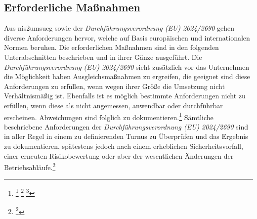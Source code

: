 \documentclass[11pt,a4paper,hidelinks]{article}   %
\begin{document}
        \subsection{Erforderliche Maßnahmen}
            Aus \gls{nis2umsucg} sowie der \emph{Durchführungsverordnung (EU) 2024/2690} gehen diverse Anforderungen hervor, welche auf Basis europäischen und internationalen Normen beruhen. Die erforderlichen Maßnahmen sind in den folgenden Unterabschnitten beschrieben und in ihrer Gänze ausgeführt. Die \emph{Durchführungsverordnung (EU) 2024/2690} sieht zusätzlich vor das Unternehmen die Möglichkeit haben Ausgleichsmaßnahmen zu ergreifen, die geeignet sind diese Anforderungen zu erfüllen, wenn wegen ihrer Größe die Umsetzung nicht Verhältnismäßig ist. Ebenfalls ist es möglich bestimmte Anforderungen nicht zu erfüllen, wenn diese als nicht angemessen, anwendbar oder durchführbar erscheinen. Abweichungen sind folglich zu dokumentieren.\footnote{
                \footcite[Vgl.][, Absatz 3]{EU2024-2690}
                \footcite[Vgl.][, Absatz 5]{EU2024-2690}
                \footcite[Vgl.][, Absatz 6]{EU2024-2690}
            } Sämtliche beschriebene Anforderungen der \emph{Durchführungsverordnung (EU) 2024/2690} sind in aller Regel in einem zu definierenden Turnus zu Überprüfen und das Ergebnis zu dokumentieren, spätestens jedoch nach einem erheblichen Sicherheitsvorfall, einer erneuten Risikobewertung oder aber der wesentlichen Änderungen der Betriebsabläufe.\footnote{
                \footcite[Vgl.][, Anhan, 1.1.2., 1.2.6., 2.1.4. , 2.2.3., 2.3.4., 3.1.3., 3.2.7., 3.5.5., 3.6.3., 4.1.4. , 4.2.6. , 4.3.4., 5.1.6., 6.1.3., 6.2.4., 6.3.3., 6.4.4., 6.5.3., 6.7.3. , 6.8.3., 6.10.4. , 7.3., 8.2.5. , 9.3., 10.1.3., 10.2.3., 10.4.2., 11.1.3. , 11.2.3., 11.3.3. , 11.5.4., 11.6.4. , 12.1.3., 12.2.3. , 12.3.3. , 12.4.3. , 13.1.3. , 13.2.3. \& 13.3.3.]{EU2024-2690}
            }
            
\end{document}
